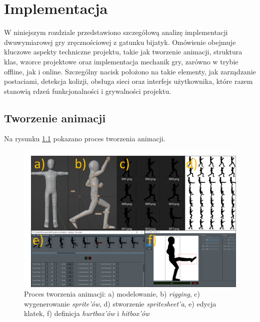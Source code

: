 \chapter{Implementacja}
W niniejszym rozdziale przedstawiono szczegółową analizę implementacji dwuwymiarowej gry zręcznościowej z gatunku bijatyk. Omówienie obejmuje kluczowe aspekty techniczne projektu, takie jak tworzenie animacji, struktura klas, wzorce projektowe oraz implementacja mechanik gry, zarówno w trybie offline, jak i online. Szczególny nacisk położono na takie elementy, jak zarządzanie postaciami, detekcja kolizji, obsługa sieci oraz interfejs użytkownika, które razem stanowią rdzeń funkcjonalności i grywalności projektu.
\section{Tworzenie animacji}
Na rysunku \ref{fig:animacja} pokazano proces tworzenia animacji.
\begin{figure}
	\centering
		\includegraphics[width=0.64\linewidth]{rys03/animacja}
	\caption{Proces tworzenia animacji: a) modelowanie, b) \emph{rigging}, c) wygenerowanie \emph{sprite'ów}, d) stworzenie \emph{spritesheet'a}, e) edycja klatek, f) definicja \emph{hurtbox'ów} i \emph{hitbox'ów}}
	\label{fig:animacja}
\end{figure}
